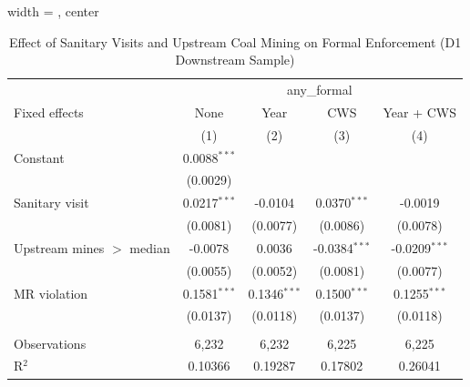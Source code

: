 
\begin{table}[htbp]
   
   \caption{\label{tab:sanitary_visit_upstream_mines_ols} Effect of Sanitary Visits and Upstream Coal Mining on Formal Enforcement (D1 Downstream Sample)}
   \bigskip
   
   \centering
   
   \begin{adjustbox}{width = \textwidth, center}
      
      
      \begin{tabular}{lcccc}
         \toprule
         
          & \multicolumn{4}{c}{any\_formal}\\
         
         Fixed effects             & None           & Year           & CWS             & Year + CWS \\   
         
                                   & (1)            & (2)            & (3)             & (4)\\  
         
         \midrule 
         Constant                  & 0.0088$^{***}$ &                &                 &   \\   
                                   & (0.0029)       &                &                 &   \\   
         Sanitary visit            & 0.0217$^{***}$ & -0.0104        & 0.0370$^{***}$  & -0.0019\\   
                                   & (0.0081)       & (0.0077)       & (0.0086)        & (0.0078)\\   
         Upstream mines $>$ median & -0.0078        & 0.0036         & -0.0384$^{***}$ & -0.0209$^{***}$\\   
                                   & (0.0055)       & (0.0052)       & (0.0081)        & (0.0077)\\   
         MR violation              & 0.1581$^{***}$ & 0.1346$^{***}$ & 0.1500$^{***}$  & 0.1255$^{***}$\\   
                                   & (0.0137)       & (0.0118)       & (0.0137)        & (0.0118)\\   
         
          \\
         
         Observations              & 6,232          & 6,232          & 6,225           & 6,225\\  
         R$^2$                     & 0.10366        & 0.19287        & 0.17802         & 0.26041\\  
         

\end{tabular}
\end{adjustbox}
\end{table}
